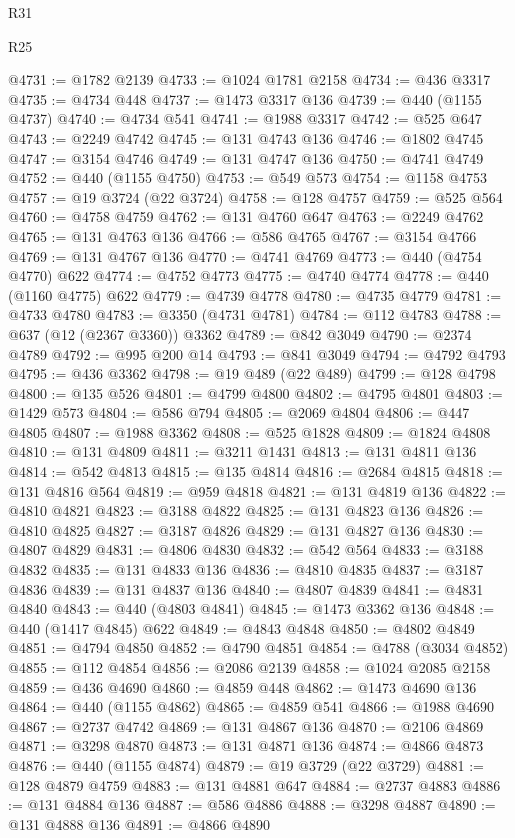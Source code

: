 \begin{lexlean}{R31}
\begin{lexlean}{R25}
\begin{coremodule}
{{{{{{{{{{{{{{{{{{{{{{{{{{{{{{{{{{{{{{{{{{{{{{{{{{{{{{{{{{{{{{{{{{{{{{{{{{{{{{{{{{{{{{{{{{{{{{{{{{{{{{{{{{{{{{{{{{{{{{{{{{{{{{{{{{{{{{{{{{{{{{{{{{{{{{{{{{{{{{{{{{{{{{{{{{{{{{{{{{{{{{{{{{{{{{{{{{{{{{{@4731 := @1782 @2139
@4733 := @1024 @1781 @2158
@4734 := @436 @3317
@4735 := @4734 @448
@4737 := @1473 @3317 @136
@4739 := @440 (@1155 @4737)
@4740 := @4734 @541
@4741 := @1988 @3317
@4742 := @525 @647
@4743 := @2249 @4742
@4745 := @131 @4743 @136
@4746 := @1802 @4745
@4747 := @3154 @4746
@4749 := @131 @4747 @136
@4750 := @4741 @4749
@4752 := @440 (@1155 @4750)
@4753 := @549 @573
@4754 := @1158 @4753
@4757 := @19 @3724 (@22 @3724)
@4758 := @128 @4757
@4759 := @525 @564
@4760 := @4758 @4759
@4762 := @131 @4760 @647
@4763 := @2249 @4762
@4765 := @131 @4763 @136
@4766 := @586 @4765
@4767 := @3154 @4766
@4769 := @131 @4767 @136
@4770 := @4741 @4769
@4773 := @440 (@4754 @4770) @622
@4774 := @4752 @4773
@4775 := @4740 @4774
@4778 := @440 (@1160 @4775) @622
@4779 := @4739 @4778
@4780 := @4735 @4779
@4781 := @4733 @4780
@4783 := @3350 (@4731 @4781)
@4784 := @112 @4783
@4788 := @637 (@12 (@2367 @3360)) @3362
@4789 := @842 @3049
@4790 := @2374 @4789
@4792 := @995 @200 @14
@4793 := @841 @3049
@4794 := @4792 @4793
@4795 := @436 @3362
@4798 := @19 @489 (@22 @489)
@4799 := @128 @4798
@4800 := @135 @526
@4801 := @4799 @4800
@4802 := @4795 @4801
@4803 := @1429 @573
@4804 := @586 @794
@4805 := @2069 @4804
@4806 := @447 @4805
@4807 := @1988 @3362
@4808 := @525 @1828
@4809 := @1824 @4808
@4810 := @131 @4809
@4811 := @3211 @1431
@4813 := @131 @4811 @136
@4814 := @542 @4813
@4815 := @135 @4814
@4816 := @2684 @4815
@4818 := @131 @4816 @564
@4819 := @959 @4818
@4821 := @131 @4819 @136
@4822 := @4810 @4821
@4823 := @3188 @4822
@4825 := @131 @4823 @136
@4826 := @4810 @4825
@4827 := @3187 @4826
@4829 := @131 @4827 @136
@4830 := @4807 @4829
@4831 := @4806 @4830
@4832 := @542 @564
@4833 := @3188 @4832
@4835 := @131 @4833 @136
@4836 := @4810 @4835
@4837 := @3187 @4836
@4839 := @131 @4837 @136
@4840 := @4807 @4839
@4841 := @4831 @4840
@4843 := @440 (@4803 @4841)
@4845 := @1473 @3362 @136
@4848 := @440 (@1417 @4845) @622
@4849 := @4843 @4848
@4850 := @4802 @4849
@4851 := @4794 @4850
@4852 := @4790 @4851
@4854 := @4788 (@3034 @4852)
@4855 := @112 @4854
@4856 := @2086 @2139
@4858 := @1024 @2085 @2158
@4859 := @436 @4690
@4860 := @4859 @448
@4862 := @1473 @4690 @136
@4864 := @440 (@1155 @4862)
@4865 := @4859 @541
@4866 := @1988 @4690
@4867 := @2737 @4742
@4869 := @131 @4867 @136
@4870 := @2106 @4869
@4871 := @3298 @4870
@4873 := @131 @4871 @136
@4874 := @4866 @4873
@4876 := @440 (@1155 @4874)
@4879 := @19 @3729 (@22 @3729)
@4881 := @128 @4879 @4759
@4883 := @131 @4881 @647
@4884 := @2737 @4883
@4886 := @131 @4884 @136
@4887 := @586 @4886
@4888 := @3298 @4887
@4890 := @131 @4888 @136
@4891 := @4866 @4890
}}}}}}}}}}}}}}}}}}}}}}}}}}}}}}}}}}}}}}}}}}}}}}}}}}}}}}}}}}}}}}}}}}}}}}}}}}}}}}}}}}}}}}}}}}}}}}}}}}}}}}}}}}}}}}}}}}}}}}}}}}}}}}}}}}}}}}}}}}}}}}}}}}}}}}}}}}}}}}}}}}}}}}}}}}}}}}}}}}}}}}}}}}}}}}}}}}}}}}}
\end{coremodule}
\end{lexlean}
\end{lexlean}
